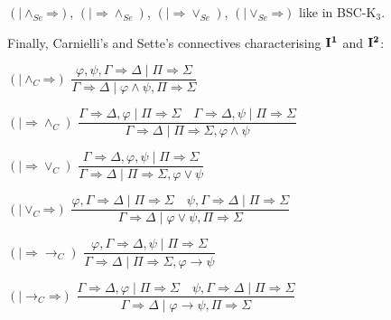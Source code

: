 \documentclass[11pt,a4paper,titlepage]{article}
\theoremstyle{definition}
\newcommand{\3}{\vspace{.3in}}
\newcommand{\2}{\vspace{.2in}}
\newcommand{\1}{\vspace{.1in}}
\newcommand{\5}{\vspace{.05in}}
\begin{document}
$(\mathord{\mid\wedge_{Se}}\mathord{\Rightarrow})$,
$(\mathord{\mid\Rightarrow}\mathord{\wedge_{Se}})$, $(\mathord{\mid\Rightarrow}\mathord{\vee_{Se}})$,
$(\mathord{\mid\vee_{Se}}\mathord{\Rightarrow})$ like in BSC-K$_3$.

\1

Finally, Carnielli's and Sette's connectives characterising ${\bf I^1}$ and ${\bf I^2}$:

\begin{flushleft}
	 $(\mathord{{\mid}\wedge_C}\mathord{\Rightarrow})$  $\dfrac{\varphi, \psi,
			\Gamma \Rightarrow \Delta \mid \Pi\Rightarrow\Sigma}{ \Gamma
			\Rightarrow \Delta \mid \varphi\wedge\psi, \Pi\Rightarrow\Sigma}$
\end{flushleft} \begin{flushleft}
$(\mathord{\mid\Rightarrow}\mathord{\wedge_C})$  $\dfrac{\Gamma
			\Rightarrow \Delta, \varphi \mid \Pi\Rightarrow\Sigma \quad
			\Gamma\Rightarrow \Delta, \psi \mid \Pi\Rightarrow\Sigma}{\Gamma \Rightarrow \Delta \mid \Pi\Rightarrow\Sigma, \varphi\wedge\psi}$
\end{flushleft}
	
\begin{flushleft}
	 $(\mathord{\mid\Rightarrow}\mathord{\vee_C})$	  $\dfrac{\Gamma
			\Rightarrow \Delta, \varphi, \psi \mid \Pi\Rightarrow\Sigma }{		\Gamma\Rightarrow \Delta \mid\Pi\Rightarrow\Sigma, \varphi\vee\psi}$
\end{flushleft} \begin{flushleft}
$(\mathord{{\mid}\vee_C}\mathord{\Rightarrow})$	  $\dfrac{\varphi, \Gamma
			\Rightarrow \Delta \mid \Pi\Rightarrow\Sigma \quad \psi, \Gamma
			\Rightarrow \Delta \mid \Pi\Rightarrow\Sigma}
		{\Gamma\Rightarrow \Delta \mid
			\varphi\vee\psi, \Pi\Rightarrow\Sigma}$
\end{flushleft}
\begin{flushleft}
	 $(\mathord{\mid\Rightarrow}\mathord{\rightarrow_C})$ $\dfrac{\varphi, \Gamma
			\Rightarrow \Delta, \psi \mid \Pi\Rightarrow\Sigma}{\Gamma\Rightarrow\Delta \mid \Pi\Rightarrow\Sigma, \varphi\rightarrow\psi}$
\end{flushleft} \begin{flushleft}
$(\mathord{\mid\rightarrow_C}\mathord{\Rightarrow})$ $\dfrac{\Gamma
			\Rightarrow \Delta, \varphi \mid \Pi\Rightarrow\Sigma \quad \psi, \Gamma\Rightarrow\Delta \mid \Pi \Rightarrow \Sigma } {\Gamma
			\Rightarrow \Delta \mid \varphi\rightarrow\psi, \Pi\Rightarrow\Sigma}$
\end{flushleft}
	
\end{document}

